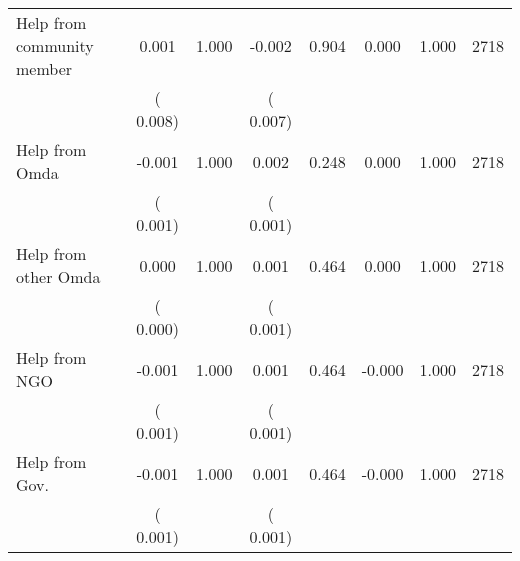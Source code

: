 \begin{tabular}{l*{7}{c}}
 Help from community member       &              0.001       &        1.000  &             -0.002       &        0.904  &              0.000       &              1.000 &  2718 \\ 
                       &       (       0.008)             &                               &       (       0.007)                     &                               &                                               &                                &                      \\ 

 Help from Omda       &             -0.001       &        1.000  &              0.002       &        0.248  &              0.000       &              1.000 &  2718 \\ 
                       &       (       0.001)             &                               &       (       0.001)                     &                               &                                               &                                &                      \\ 

 Help from other Omda       &              0.000       &        1.000  &              0.001       &        0.464  &              0.000       &              1.000 &  2718 \\ 
                       &       (       0.000)             &                               &       (       0.001)                     &                               &                                               &                                &                      \\ 

 Help from NGO       &             -0.001       &        1.000  &              0.001       &        0.464  &             -0.000       &              1.000 &  2718 \\ 
                       &       (       0.001)             &                               &       (       0.001)                     &                               &                                               &                                &                      \\ 

 Help from Gov.       &             -0.001       &        1.000  &              0.001       &        0.464  &             -0.000       &              1.000 &  2718 \\ 
                       &       (       0.001)             &                               &       (       0.001)                     &                               &                                               &                                &                      \\ 

\hline \end{tabular}